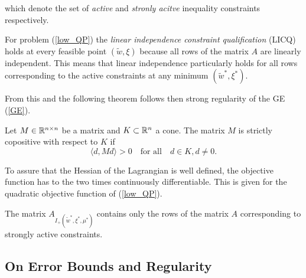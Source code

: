 which denote the set of \emph{active} and \emph{stronly acitve} inequality constraints respectively.

For problem (\ref{low_QP}) the \emph{linear independence constraint qualification} (LICQ) holds at every feasible point \((\tilde{w},\xi)\) because all rows of the matrix \(A\) are linearly independent. This means that linear independence particularly holds for all rows corresponding to the active constraints at any minimum \((\tilde{w}^*,\xi^*)\).

From this and the following theorem follows then strong regularity of the GE (\ref{GE}).

\begin{theorem}
	
\end{theorem}

\begin{definition}
	Let \(M \in \mathbb{R}^{n\times n}\) be a matrix and \(K \subset \mathbb{R}^n\) a cone. The matrix \(M\) is strictly copositive with respect to \(K\) if 
	\[ \langle d,Md \rangle > 0 \quad \text{for all} \quad d \in K, d\neq 0. \]
\end{definition}

To assure that the Hessian of the Lagrangian is well defined, the objective function has to the two times continuously differentiable. This is given for the quadratic objective function of (\ref{low_QP}).

The matrix \(A_{I_+(\tilde{w}^*,\xi^*,\mu^*)}\) contains only the rows of the matrix \(A\) corresponding to strongly active constraints. 






%


\subsection{On Error Bounds and Regularity}

